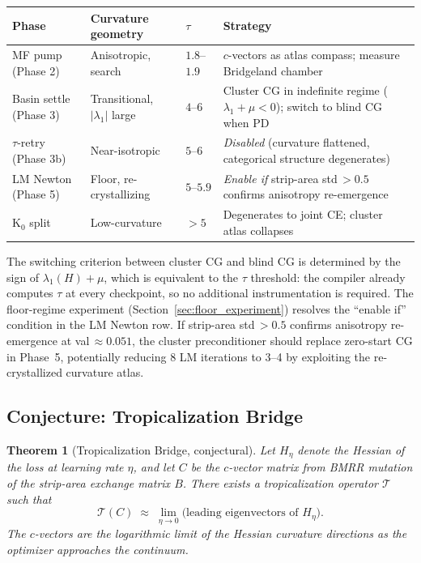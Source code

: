 \documentclass[11pt]{amsart}
\newtheorem{theorem}{Theorem}[section]
\begin{document}
\begin{center}
\small
\begin{tabular}{@{}lllp{4.5cm}@{}}
\toprule
Phase & Curvature geometry & $\tau$ & Strategy \\
\midrule
MF pump (Phase 2)
  & Anisotropic, search
  & $1.8$--$1.9$
  & $c$-vectors as atlas compass; measure Bridgeland chamber \\
Basin settle (Phase 3)
  & Transitional, $|\lambda_1|$ large
  & $4$--$6$
  & Cluster CG in indefinite regime ($\lambda_1 + \mu < 0$);
    switch to blind CG when PD \\
$\tau$-retry (Phase 3b)
  & Near-isotropic
  & $5$--$6$
  & \emph{Disabled} (curvature flattened, categorical structure
    degenerates) \\
LM Newton (Phase 5)
  & Floor, re-crystallizing
  & $5$--$5.9$
  & \emph{Enable if} strip-area std\,$> 0.5$ confirms
    anisotropy re-emergence \\
K$_0$ split
  & Low-curvature
  & $> 5$
  & Degenerates to joint CE; cluster atlas collapses \\
\bottomrule
\end{tabular}
\end{center}

The switching criterion between cluster CG and blind CG is determined
by the sign of $\lambda_1(H) + \mu$, which is equivalent to the
$\tau$ threshold: the compiler already computes $\tau$ at every
checkpoint, so no additional instrumentation is required.
The floor-regime experiment (Section~\ref{sec:floor_experiment})
resolves the ``enable if'' condition in the LM Newton row.
If strip-area std\,$> 0.5$ confirms anisotropy re-emergence at
val\,$\approx 0.051$, the cluster preconditioner should replace
zero-start CG in Phase~5, potentially reducing 8 LM iterations to
3--4 by exploiting the re-crystallized curvature atlas.


\subsection{Conjecture: Tropicalization Bridge}
\label{sec:tropicalization}

\begin{theorem}[Tropicalization Bridge, conjectural]
\label{conj:trop}
Let $H_\eta$ denote the Hessian of the loss at learning rate $\eta$,
and let $C$ be the $c$-vector matrix from BMRR mutation of the strip-area
exchange matrix $B$.
There exists a tropicalization operator $\mathcal{T}$ such that
\[
  \mathcal{T}(C) \;\approx\;
  \lim_{\eta\to 0}
  \bigl(\text{leading eigenvectors of }H_\eta\bigr).
\]
The $c$-vectors are the \emph{logarithmic limit} of the Hessian curvature
directions as the optimizer approaches the continuum.
\end{theorem}
\end{document}

